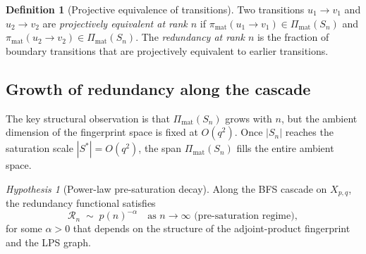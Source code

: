 \documentclass[11pt]{article}
\theoremstyle{definition}
\newtheorem{definition}[theorem]{Definition}
\theoremstyle{remark}
\newtheorem{hypothesis}[theorem]{Hypothesis}
\newcommand{\Rn}{\mathcal{R}_n}
\begin{document}
    \begin{definition}[Projective equivalence of transitions]
      \label{def:proj-equiv}
      Two transitions $u_1 \to v_1$ and $u_2 \to v_2$ are \emph{projectively equivalent
      at rank $n$} if
      $\pi_{\mathrm{mat}}(u_1 \to v_1) \in \Pi_{\mathrm{mat}}(S_n)$ and
      $\pi_{\mathrm{mat}}(u_2 \to v_2) \in \Pi_{\mathrm{mat}}(S_n)$.
      The \emph{redundancy at rank $n$} is the fraction of boundary transitions that are
      projectively equivalent to earlier transitions.
    \end{definition}

  \subsection{Growth of redundancy along the cascade}
    \label{ssec:Rn-growth}

    The key structural observation is that $\Pi_{\mathrm{mat}}(S_n)$ grows with $n$,
    but the ambient dimension of the fingerprint space is fixed at $O(q^2)$.
    Once $|S_n|$ reaches the saturation scale $|S^*| = O(q^2)$, the span
    $\Pi_{\mathrm{mat}}(S_n)$ fills the entire ambient space.

    \begin{hypothesis}[Power-law pre-saturation decay]
      \label{hyp:power-law}
      Along the BFS cascade on $X_{p,q}$, the redundancy functional satisfies
      \begin{equation}
        \label{eq:Rn-decay}
        \Rn \;\sim\; p(n)^{-\alpha}
        \quad \text{as } n \to \infty \text{ (pre-saturation regime)},
      \end{equation}
      for some $\alpha > 0$ that depends on the structure of the adjoint-product
      fingerprint and the LPS graph.
    \end{hypothesis}
\end{document}
